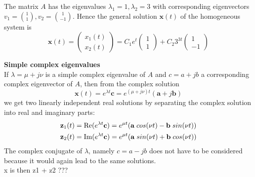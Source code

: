 The matrix $A$ has the eigenvalues $\lambda_1 = 1, \lambda_2 = 3$ with corresponding eigenvectors $v_1 = \binom{1}{1}, v_2 = \binom{1}{-1}$. Hence the general solution $\mathbf{x}(t)$ of the homogeneous system is
\begin{equation}
  \mathbf{x}(t) = \begin{pmatrix}
    x_1(t)\\
    x_2(t)
  \end{pmatrix} = C_1 e^t \begin{pmatrix} 1 \\ 1 \end{pmatrix} +
  C_2 3^{3t} \begin{pmatrix} 1 \\ -1 \end{pmatrix}
\end{equation}

\textbf{Simple complex eigenvalues}\\
If $\lambda = \mu + j\nu$ is a simple complex eigenvalue of $A$ and $c = a + jb$ a corresponding complex eigenvector of $A$, then from the complex solution
\begin{equation}
  \mathbf{x}(t) = e^{\lambda t} \mathbf{c} = e^{(\mu + j\nu)t} (\mathbf{a} + j\mathbf{b})
\end{equation}
we get two linearly independent real solutions by separating the complex solution into real and imaginary parts:
\begin{equation}
  \begin{split}
    \mathbf{z}_1(t) &= \textup{Re}(e^{\lambda t} \mathbf{c}) = e^{\mu t}(\mathbf{a} \; cos(\nu t) - \mathbf{b} \; sin(\nu t))\\
    \mathbf{z}_2(t) &= \textup{Im}(e^{\lambda t} \mathbf{c}) = e^{\mu t}(\mathbf{a} \; sin(\nu t) + \mathbf{b} \; cos(\nu t))
  \end{split}
\end{equation}
The complex conjugate of $\lambda$, namely $c = a - jb$ does not have to be considered because it would again lead to the same solutions.\\
x is then z1 + z2 ???\\

